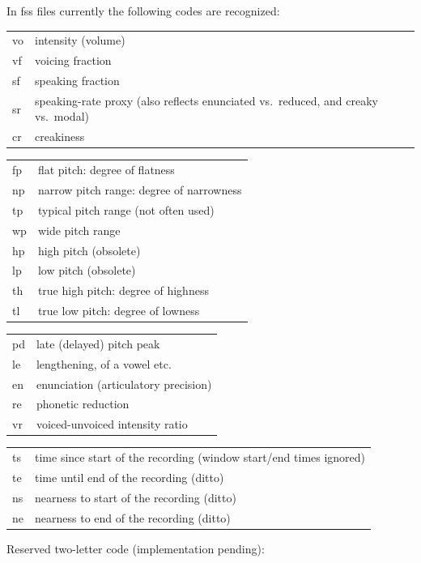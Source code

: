 \documentclass[11pt]{article}
\begin{document}
In fss files currently the following codes are recognized:


\begin{tabular}{ll}
  vo  & intensity (volume) \\
  vf  & voicing fraction \\
  sf  & speaking fraction \\
  sr  & speaking-rate proxy (also reflects enunciated vs.~reduced, and creaky vs.~modal) \\
  cr  & creakiness \\
\end{tabular}

\begin{tabular}{ll}
  fp  & flat pitch: degree of flatness \\
  np  & narrow pitch range: degree of narrowness \\
  tp  & typical pitch range (not often used)\\
  wp  & wide pitch range  \\
  hp  & high pitch (obsolete) \\ 
  lp  & low pitch (obsolete) \\
  th  & true high pitch: degree of highness  \\ 
  tl  & true low pitch: degree of lowness \\
\end{tabular}

\begin{tabular}{ll}
  pd  & late (delayed) pitch peak \\
  le  & lengthening, of a vowel etc. \\
  en  & enunciation (articulatory precision) \\
  re  & phonetic reduction \\
  vr & voiced-unvoiced intensity ratio \\
\end{tabular}

\begin{tabular}{ll}
  ts  & time since start of the recording (window start/end times ignored) \\
  te  & time until end of the recording (ditto) \\
  ns  & nearness to start of the recording (ditto) \\
  ne  & nearness to end of the recording (ditto) \\
\end{tabular}

Reserved two-letter code (implementation pending): 
\end{document}
